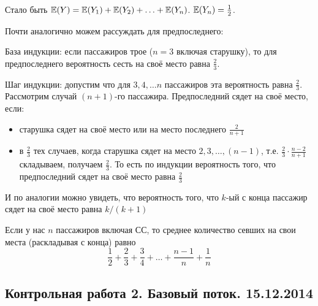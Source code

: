 \documentclass[12pt, a4paper]{article}\usepackage[]{graphicx}\usepackage[]{color}
\begin{document}
\begin{enumerate}
\begin{enumerate}
Стало быть $\mathbb{E}(Y)=\mathbb{E}(Y_1)+\mathbb{E}(Y_2)+\ldots+\mathbb{E}(Y_n)$. $\mathbb{E}(Y_n)=\frac{1}{2}$.

Почти аналогично можем рассуждать для предпоследнего:

База индукции: если пассажиров трое ($n=3$ включая старушку), то для предпоследнего вероятность сесть на своё место равна $\frac{2}{3}$.

Шаг индукции: допустим что для $3, 4, \ldots n$ пассажиров эта вероятность равна $\frac{2}{3}$.
Рассмотрим случай $(n+1)$-го пассажира.
Предпоследний сядет на своё место, если:

\renewcommand{\labelitemi}{\textbullet}

\begin{itemize}
\item старушка сядет на своё место или на место последнего $\frac{2}{n+1}$
\item в $\frac{2}{3}$ тех случаев, когда старушка сядет на место $2, 3, \ldots, (n-1)$, т.е. $\frac{2}{3}\cdot \frac{n-2}{n+1}$
складываем, получаем $\frac{2}{3}$.
То есть по индукции вероятность того, что предпоследний сядет на своё место равна $\frac{2}{3}$
\end{itemize}
И по аналогии можно увидеть, что вероятность того, что $k$-ый с конца пассажир сядет на своё место равна $k/(k+1)$

Если у нас $n$ пассажиров включая СС, то среднее количество севших на свои места (раскладывая с конца) равно \[\frac{1}{2}+\frac{2}{3}+\frac{3}{4}+\dots+\frac{n-1}{n}+\frac{1}{n}\]

\end{enumerate}

\end{enumerate}



\subsection{Контрольная работа 2. Базовый поток. 15.12.2014}
\end{document}
